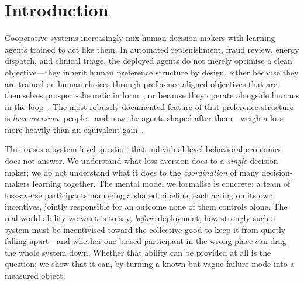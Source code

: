 \documentclass[letterpaper]{article}
\theoremstyle{plain}
\begin{document}
\section{Introduction}
\label{sec:intro}

Cooperative systems increasingly mix human decision-makers with learning agents
trained to act like them. In automated replenishment, fraud review, energy
dispatch, and clinical triage, the deployed agents do not merely optimise a
clean objective---they inherit human preference structure by design, either
because they are trained on human choices through preference-aligned objectives
that are themselves prospect-theoretic in form~\citep{ethayarajh2024kto}, or
because they operate alongside humans in the loop~\citep{lalmohammed2025}. The
most robustly documented feature of that preference structure is \emph{loss
aversion}: people---and now the agents shaped after them---weigh a loss more
heavily than an equivalent gain~\citep{kahneman1979,tversky1992}.

This raises a system-level question that individual-level behavioral economics
does not answer. We understand what loss aversion does to a \emph{single}
decision-maker; we do not understand what it does to the \emph{coordination} of
many decision-makers learning together. The mental model we formalise is
concrete: a team of loss-averse participants managing a shared pipeline, each
acting on its own incentives, jointly responsible for an outcome none of them
controls alone. The real-world ability we want is to say, \emph{before}
deployment, how strongly such a system must be incentivised toward the
collective good to keep it from quietly falling apart---and whether one biased
participant in the wrong place can drag the whole system down. Whether that
ability can be provided at all is the question; we show that it can, by turning
a known-but-vague failure mode into a measured object.

\end{document}
